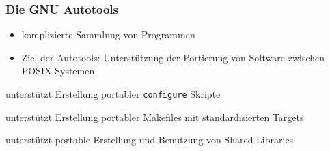 \begin{frame}
	\frametitle{Die GNU Autotools}
	\begin{itemize}
		\pause
		\item komplizierte Sammlung von Programmen
		\pause
		\item Ziel der Autotools: Unterstützung der Portierung von Software zwischen POSIX-Systemen
	\end{itemize}
	\begin{description}
		\pause
		\item[Autoconf]	unterstützt Erstellung portabler \texttt{configure} Skripte
		\pause
		\item[Automake]	unterstützt Erstellung portabler Makefiles mit standardisierten Targets
		\pause
		\item[Libtool] 	unterstützt portable Erstellung und Benutzung von Shared Libraries
	\end{description}
\end{frame}
%
